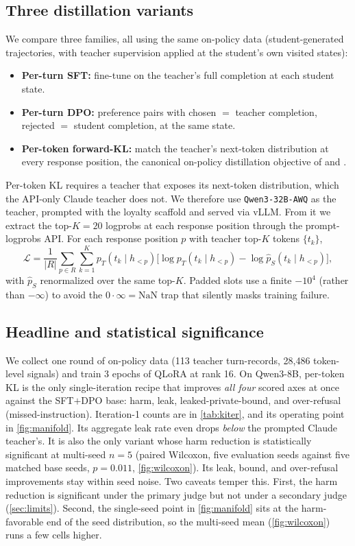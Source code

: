 \documentclass[11pt]{article}
\begin{document}
\subsection{Three distillation variants}
\label{sec:variants}
We compare three families, all using the same on-policy data (student-generated trajectories, with teacher supervision applied at the student's own visited states):
\begin{itemize}[leftmargin=2em,itemsep=1pt,topsep=2pt]
\item \textbf{Per-turn SFT:} fine-tune on the teacher's full completion at each student state.
\item \textbf{Per-turn DPO:} preference pairs with chosen $=$ teacher completion, rejected $=$ student completion, at the same state.
\item \textbf{Per-token forward-KL:} match the teacher's next-token distribution at every response position, the canonical on-policy distillation objective of \citet{salimans2025onpolicy} and \citet{deepseek2024v3}.
\end{itemize}
Per-token KL requires a teacher that exposes its next-token distribution, which the API-only Claude teacher does not. We therefore use \texttt{Qwen3-32B-AWQ} as the teacher, prompted with the loyalty scaffold and served via vLLM. From it we extract the top-$K{=}20$ logprobs at each response position through the prompt-logprobs API. For each response position $p$ with teacher top-$K$ tokens $\{t_k\}$,
\[
\mathcal{L} = \frac{1}{|R|}\sum_{p\in R}\sum_{k=1}^{K} p_T(t_k\mid h_{<p})\big[\log p_T(t_k\mid h_{<p}) - \log \hat p_S(t_k\mid h_{<p})\big],
\]
with $\hat p_S$ renormalized over the same top-$K$. Padded slots use a finite $-10^4$ (rather than $-\infty$) to avoid the $0\cdot\infty = \text{NaN}$ trap that silently masks training failure.

\subsection{Headline and statistical significance}
We collect one round of on-policy data (113 teacher turn-records, 28{,}486 token-level signals) and train 3 epochs of QLoRA at rank 16. On Qwen3-8B, per-token KL is the only single-iteration recipe that improves \emph{all four} scored axes at once against the SFT$+$DPO base: harm, leak, leaked-private-bound, and over-refusal (missed-instruction). Iteration-1 counts are in \cref{tab:kiter}, and its operating point in \cref{fig:manifold}. Its aggregate leak rate even drops \emph{below} the prompted Claude teacher's. It is also the only variant whose harm reduction is statistically significant at multi-seed $n{=}5$ (paired Wilcoxon, five evaluation seeds against five matched base seeds, $p=0.011$, \cref{fig:wilcoxon}). Its leak, bound, and over-refusal improvements stay within seed noise. Two caveats temper this. First, the harm reduction is significant under the primary judge but not under a secondary judge (\cref{sec:limits}). Second, the single-seed point in \cref{fig:manifold} sits at the harm-favorable end of the seed distribution, so the multi-seed mean (\cref{fig:wilcoxon}) runs a few cells higher.
\end{document}
